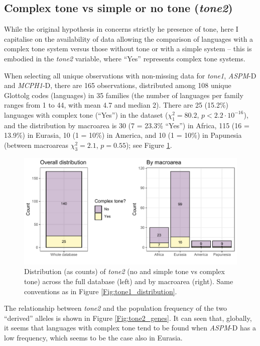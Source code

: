 \documentclass[twoside,onecolumn]{article}
\begin{document}
\subsection{Complex tone vs simple or no tone (\textit{tone2})}

While the original hypothesis in \citet{dediu_ladd_2007} concerns strictly he presence of tone, here I capitalise on the availability of data allowing the comparison of languages with a complex tone system versus those without tone or with a simple system -- this is embodied in the \textit{tone2} variable, where ``Yes'' represents complex tone systems.

When selecting all unique observations with non-missing data for \textit{tone1}, \textit{ASPM}-D and \textit{MCPH1}-D, there are 165 observations, distributed among 108 unique Glottolg codes (languages) in 35 families (the number of languages per family ranges from 1 to 44, with mean 4.7 and median 2).
There are 25 (15.2\%) languages with complex tone (``Yes'') in the dataset ($\chi^2_{1} = 80.2$, $p < 2.2\cdot10^{-16}$), and the distribution by macroarea is 30 (7 = 23.3\% ``Yes'') in Africa, 115 (16 = 13.9\%) in Eurasia, 10 (1 = 10\%) in America, and 10 (1 = 10\%) in Papunesia (between macroareas $\chi^2_{3} = 2.1$, $p = 0.55$); see Figure \ref{Fig:tone2_distribution}.

\begin{figure}[h]
  \centering
  \includegraphics[width=\textwidth]{../../code/figures/tone2_distribution}
  \caption{Distribution (as counts) of \textit{tone2} (no and simple tone vs complex tone) across the full database (left) and by macroarea (right). Same conventions as in Figure \ref{Fig:tone1_distribution}.}
  \label{Fig:tone2_distribution}
\end{figure}

The relationship between \textit{tone2} and the population frequency of the two ``derived'' alleles is shown in Figure \ref{Fig:tone2_genes}.
It can seen that, globally, it seems that languages with complex tone tend to be found when \textit{ASPM}-D has a low frequency, which seems to be the case also in Eurasia.
\end{document}
